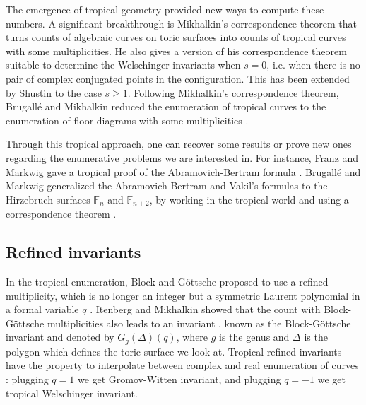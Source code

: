 \documentclass[11pt]{article}
\theoremstyle{definition}
\numberwithin{equation}{section}
\newcommand{\FF}{\mathbb{F}}
\theoremstyle{plain}
\begin{document}
The emergence of tropical geometry provided new ways to compute these numbers. A significant breakthrough is Mikhalkin's correspondence theorem \cite{mikhalkin_enumerative_2005} that turns counts of algebraic curves on toric surfaces into counts of tropical curves with some multiplicities. He also gives a version of his correspondence theorem suitable to determine the Welschinger invariants when $s=0$, i.e.  when there is no pair of complex conjugated points in the configuration. This has been extended by Shustin \cite{shustin-2006-tropical} to the case $s\geqslant1$.
Following Mikhalkin's correspondence theorem, Brugallé and Mikhalkin reduced the enumeration of tropical curves to the enumeration of floor diagrams with some multiplicities \cite{brugalle_enumeration_2007, brugalle_floor_2008}.

Through this tropical approach, one can recover some results or prove new ones regarding the enumerative problems we are interested in. For instance, Franz and Markwig gave a tropical proof of the Abramovich-Bertram formula \cite{franz-2011-tropical}. 
Brugallé and Markwig generalized the Abramovich-Bertram and Vakil's formulas to the Hirzebruch surfaces $\FF_n$ and $\FF_{n+2}$, by working in the tropical world and using a correspondence theorem \cite{brugalle-2016-deformation}. 



\subsection{Refined invariants}


In the tropical enumeration, Block and Göttsche proposed to use a refined multiplicity, which is no longer an integer but a symmetric Laurent polynomial in a formal variable $q$ \cite{block_refined_2016}. Itenberg and Mikhalkin showed that the count with Block-Göttsche multiplicities also leads to an invariant \cite{itenberg_block-gottsche_2013}, known as the Block-Göttsche invariant and denoted by $G_g(\Delta)(q)$, where $g$ is the genus and $\Delta$ is the polygon which defines the toric surface we look at. Tropical refined invariants have the property to interpolate between complex and real enumeration of curves : plugging $q=1$ we get Gromov-Witten invariant, and plugging $q=-1$ we get tropical Welschinger invariant.
\end{document}
